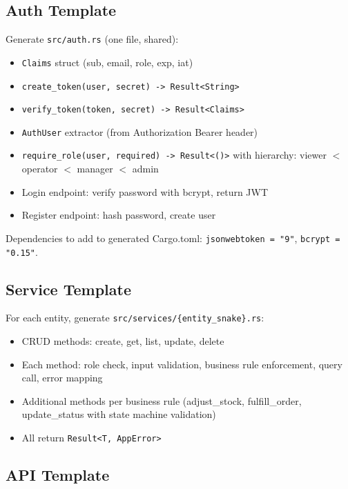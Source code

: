 \documentclass[11pt,a4paper]{article}
\begin{document}
\subsection{Auth Template}

Generate \texttt{src/auth.rs} (one file, shared):
\begin{itemize}
\item \texttt{Claims} struct (sub, email, role, exp, iat)
\item \texttt{create\_token(user, secret) -> Result<String>}
\item \texttt{verify\_token(token, secret) -> Result<Claims>}
\item \texttt{AuthUser} extractor (from Authorization Bearer header)
\item \texttt{require\_role(user, required) -> Result<()>} with hierarchy:
  viewer $<$ operator $<$ manager $<$ admin
\item Login endpoint: verify password with bcrypt, return JWT
\item Register endpoint: hash password, create user
\end{itemize}

Dependencies to add to generated Cargo.toml: \texttt{jsonwebtoken = "9"},
\texttt{bcrypt = "0.15"}.

\subsection{Service Template}

For each entity, generate \texttt{src/services/\{entity\_snake\}.rs}:
\begin{itemize}
\item CRUD methods: create, get, list, update, delete
\item Each method: role check, input validation, business rule enforcement,
  query call, error mapping
\item Additional methods per business rule (adjust\_stock, fulfill\_order,
  update\_status with state machine validation)
\item All return \texttt{Result<T, AppError>}
\end{itemize}

\subsection{API Template}
\end{document}
